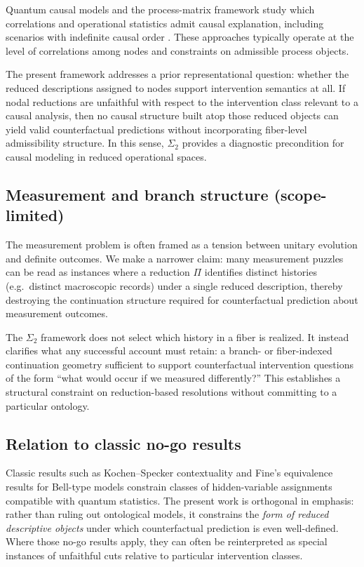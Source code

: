Quantum causal models and the process-matrix framework study which correlations and operational
statistics admit causal explanation, including scenarios with indefinite causal order
\cite{Oreshkov2012,CostaShrapnel2016,WoodSpekkens2015}. These approaches typically operate at the
level of correlations among nodes and constraints on admissible process objects.

The present framework addresses a prior representational question: whether the reduced
descriptions assigned to nodes support intervention semantics at all. If nodal reductions are
unfaithful with respect to the intervention class relevant to a causal analysis, then no causal
structure built atop those reduced objects can yield valid counterfactual predictions without
incorporating fiber-level admissibility structure. In this sense, $\Sigma_2$ provides a
diagnostic precondition for causal modeling in reduced operational spaces.

\subsection{Measurement and branch structure (scope-limited)}
\label{sec:measurement}

The measurement problem is often framed as a tension between unitary evolution and definite
outcomes. We make a narrower claim: many measurement puzzles can be read as instances where a
reduction $\Pi$ identifies distinct histories (e.g.\ distinct macroscopic records) under a
single reduced description, thereby destroying the continuation structure required for
counterfactual prediction about measurement outcomes.

The $\Sigma_2$ framework does not select which history in a fiber is realized. It instead
clarifies what any successful account must retain: a branch- or fiber-indexed continuation
geometry sufficient to support counterfactual intervention questions of the form
``what would occur if we measured differently?'' This establishes a structural constraint on
reduction-based resolutions without committing to a particular ontology.

\subsection{Relation to classic no-go results}
\label{sec:nogos}

Classic results such as Kochen--Specker contextuality \cite{KochenSpecker1967} and Fine's
equivalence results for Bell-type models \cite{Fine1982} constrain classes of hidden-variable
assignments compatible with quantum statistics. The present work is orthogonal in emphasis:
rather than ruling out ontological models, it constrains the \emph{form of reduced descriptive
objects} under which counterfactual prediction is even well-defined. Where those no-go results
apply, they can often be reinterpreted as special instances of unfaithful cuts relative to
particular intervention classes.